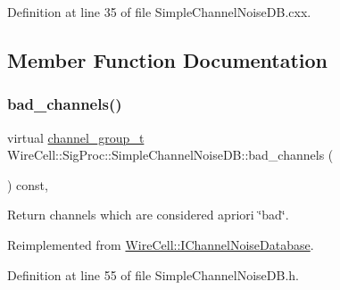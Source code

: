 Definition at line 35 of file Simple\+Channel\+Noise\+D\+B.\+cxx.



\subsection{Member Function Documentation}
\mbox{\label{class_wire_cell_1_1_sig_proc_1_1_simple_channel_noise_d_b_abc31faca2ae9ee69ebfd01b9edd36289}} 
\subsubsection{\texorpdfstring{bad\+\_\+channels()}{bad\_channels()}}
{\footnotesize\ttfamily virtual \hyperlink{class_wire_cell_1_1_i_channel_noise_database_a7fedd6ab67ba4e7eeb8cf182cc9dc6b1}{channel\+\_\+group\+\_\+t} Wire\+Cell\+::\+Sig\+Proc\+::\+Simple\+Channel\+Noise\+D\+B\+::bad\+\_\+channels (\begin{DoxyParamCaption}{ }\end{DoxyParamCaption}) const\hspace{0.3cm}{\ttfamily [inline]}, {\ttfamily [virtual]}}



Return channels which are considered a\textquotesingle{}priori \char`\"{}bad\char`\"{}. 



Reimplemented from \hyperlink{class_wire_cell_1_1_i_channel_noise_database_a70f4c0a24525f6a7c8ef84245fd6d01e}{Wire\+Cell\+::\+I\+Channel\+Noise\+Database}.



Definition at line 55 of file Simple\+Channel\+Noise\+D\+B.\+h.

